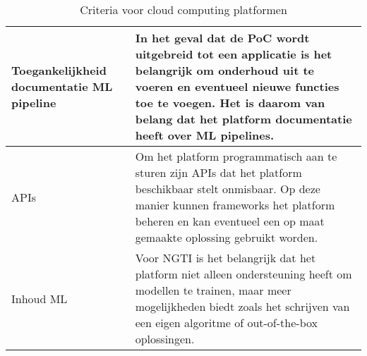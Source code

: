 \begin{table}[hbt!]
\begin{tabular}{|p{.2\linewidth}|p{.69\linewidth}|}
    Toegankelijkheid documentatie ML pipeline
    &
    In het geval dat de PoC wordt uitgebreid tot een applicatie is het belangrijk om onderhoud uit te voeren en eventueel nieuwe functies toe te voegen. Het is daarom van belang dat het platform documentatie heeft over ML pipelines. 
    \\ \hline

    APIs
    &
    Om het platform programmatisch aan te sturen zijn APIs dat het platform beschikbaar stelt onmisbaar. Op deze manier kunnen frameworks het platform beheren en kan eventueel een op maat gemaakte oplossing gebruikt worden.
    \\ \hline

    Inhoud ML
    &
    Voor NGTI is het belangrijk dat het platform niet alleen ondersteuning heeft om modellen te trainen, maar meer mogelijkheden biedt zoals het schrijven van een eigen algoritme of out-of-the-box oplossingen.
    \\ \hline
  \end{tabular}
  \caption{Criteria voor cloud computing platformen}
  \label{table:criteria-cloud-computing-platforms}
\end{table}

\newpage
